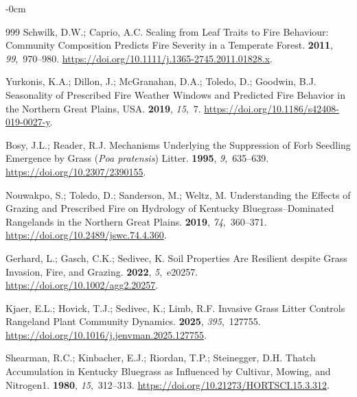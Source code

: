 \documentclass[fire,article,accept,oneauthor,pdftex]{Definitions/mdpi}
\begin{document}
\begin{adjustwidth}{-\extralength}{0cm}
\begin{thebibliography}{999}
Schwilk, D.W.; Caprio, A.C.
\newblock Scaling from Leaf Traits to Fire Behaviour: Community Composition
  Predicts Fire Severity in a Temperate Forest.
 {\bf 2011}, {\em 99},~970--980.
\newblock
  \url{https://doi.org/10.1111/j.1365-2745.2011.01828.x}.

Yurkonis, K.A.; Dillon, J.; McGranahan, D.A.; Toledo, D.; Goodwin, B.J.
\newblock Seasonality of Prescribed Fire Weather Windows and Predicted Fire
  Behavior in the Northern {{Great Plains}}, {{USA}}.
 {\bf 2019}, {\em 15},~7.
\newblock
  \url{https://doi.org/10.1186/s42408-019-0027-y}.

Bosy, J.L.; Reader, R.J.
\newblock Mechanisms {{Underlying}} the {{Suppression}} of {{Forb Seedling
  Emergence}} by {{Grass}} (\textit{{{Poa}} pratensis}) {{Litter}}.
 {\bf 1995}, {\em 9},~635--639.
  \url{https://doi.org/10.2307/2390155}.

Nouwakpo, S.; Toledo, D.; Sanderson, M.; Weltz, M.
\newblock Understanding the Effects of Grazing and Prescribed Fire on Hydrology
  of {{Kentucky}} Bluegrass--Dominated Rangelands in the Northern {{Great
  Plains}}.
 {\bf 2019}, {\em
  74},~360--371.
\newblock
  \url{https://doi.org/10.2489/jswc.74.4.360}.

Gerhard, L.; Gasch, C.K.; Sedivec, K.
\newblock Soil Properties Are Resilient despite Grass Invasion, Fire, and
  Grazing.
 {\bf 2022}, {\em
  5},~e20257.
\newblock
  \url{https://doi.org/10.1002/agg2.20257}.

Kjaer, E.L.; Hovick, T.J.; Sedivec, K.; Limb, R.F.
\newblock Invasive Grass Litter Controls Rangeland Plant Community Dynamics.
 {\bf 2025}, {\em
  395},~127755.
\newblock
  \url{https://doi.org/10.1016/j.jenvman.2025.127755}.

Shearman, R.C.; Kinbacher, E.J.; Riordan, T.P.; Steinegger, D.H.
\newblock Thatch {{Accumulation}} in {{Kentucky Bluegrass}} as {{Influenced}}
  by {{Cultivar}}, {{Mowing}}, and {{Nitrogen1}}.
 {\bf 1980}, {\em 15},~312--313.
\newblock
  \url{https://doi.org/10.21273/HORTSCI.15.3.312}.


\end{thebibliography}
\end{adjustwidth}
\end{document}
